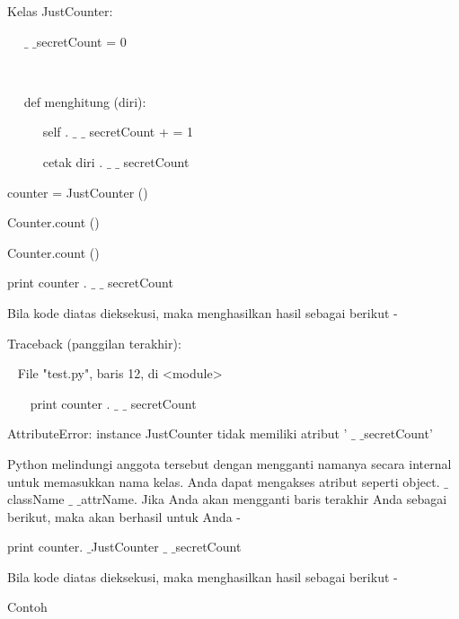 {Kelas JustCounter: \par
\noindent 
~~  $  \_  $ $  \_  $secretCount = 0 \par
\noindent 
~  \par
\noindent 
~~ def menghitung (diri): \par
\noindent 
~~~~~ self . $  \_  $ $  \_  $ secretCount + = 1 \par
\noindent 
~~~~~ cetak diri . $  \_  $ $  \_  $ secretCount \par
\vspace{12pt}
\noindent 
counter = JustCounter () \par
\noindent 
Counter.count () \par
\noindent 
Counter.count () \par
\noindent 
print counter . $  \_  $ $  \_  $ secretCount \par
\vspace{12pt}
\noindent 
Bila kode diatas dieksekusi, maka menghasilkan hasil sebagai berikut - \par
\vspace{12pt}
 \par
{} \par
\noindent 
Traceback (panggilan terakhir): \par
\noindent 
~ File "test.py", baris 12, di <module> \par
\noindent 
~~~ print counter . $  \_  $ $  \_  $ secretCount \par
\noindent 
AttributeError: instance JustCounter tidak memiliki atribut ' $  \_  $ $  \_  $secretCount' \par
\vspace{12pt}

Python melindungi anggota tersebut dengan mengganti namanya secara internal untuk memasukkan nama kelas. Anda dapat mengakses atribut seperti object. $  \_  $className $  \_  $ $  \_  $attrName. Jika Anda akan mengganti baris terakhir Anda sebagai berikut, maka akan berhasil untuk Anda - \par
\vspace{12pt}
\noindent 
print counter. $  \_  $JustCounter $  \_  $ $  \_  $secretCount \par
\vspace{12pt}
\noindent 
Bila kode diatas dieksekusi, maka menghasilkan hasil sebagai berikut - \par
\vspace{12pt}
 \par
{} \par
{} \par
\vspace{12pt}
Contoh \par
\vspace{12pt}

}

